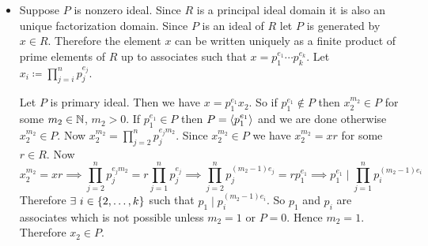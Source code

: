 \documentclass[a4paper, 11pt]{article}
\newtheorem{lemma}{Lemma}
\renewenvironment{proof}{\noindent{\it \textbf{Proof:}}\hspace*{1em}}{\hfill\qed\bigskip\\}
\begin{document}
{\begin{itemize}[label=$\bullet$]
Therefore $\la x\ra$ is the product  of finitely many prime ideals. Now we will show that prime ideals are maximal ideals in a principal ideal domain.
\begin{lemma}
	Every nonzero prime ideal in a principal ideal domain is maximal ideal.
\end{lemma}
\begin{proof}
	Let $\la p\ra$ be a nonzero prime ideal in the principal ideal domain. Let $I=\la y\ra$ where $y\in R$ be any idea which contains $\la p\ra$. We will show that $I=\la p\ra$ or $I=R$. Since $\la p\ra \subseteq I$ we have $p\in I$. Therefore there exists $r\in R$ such that $p=ry$. Since $\la p\ra$ is a prime ideal and $ry\in \la p\ra$ either $r\in \la p \ra$ or $y\in \la p \ra$. If $y\in \la p\ra$  then $\la y\ra=\la p\ra$.. But if $r\in \la p\ra$ then $\exs\ s\in R$ such that $r=ps$. Then $p=ry=psy\implies sx=1$. Therefore $y$ is an unit. Therefore $I=R$. Hence $\la p\ra$ is a maximal ideal
\end{proof}
Since $\la x\ra = \la p_1\ra^{e_1}\cdots \la p_k\ra^{e_k}$, $\forall\ i\in[k]$, $\la p_i\ra$ is a maximal ideal. Therefore $\la x\ra$ can be written as a finitely many product of maximal ideals which are uniquely determined up to order. 
	\item Suppose $P$ is nonzero ideal. Since $R$ is a principal ideal domain it is also an unique factorization domain. Since $P$ is an ideal of $R$ let $P$ is generated by $x\in R$. Therefore the element $x$ can be written uniquely as a finite product of prime elements of $R$ up to associates such that   $ x =  p_1^{e_1}\cdots  p_k ^{e_k} $. Let $x_i\coloneqq \prod\limits_{j=i}^{n} p_j^{e_j}$.\parinn 
	
	Let $P$ is primary ideal. Then we have $x=p_1 ^{e_1}x_2$. So if $p_1 ^{e_1}\notin P$ then $x_2^{m_2}\in P$ for some $m_2\in\mathbb{N}$, $m_2>0$. If $p_1 ^{e_1}\in P$ then $P=\langle p_1 ^{e_1}\rangle$ and we are done otherwise $x_2^{m_2}\in P$. Now $x_2^{m_2}=\prod\limits_{j=2}^{n} p_j^{e_jm_2}$. Since $x_2^{m_2}\in P$ we have $x_2^{m_2}=xr$ for some $r\in R$. Now $$x_2^{m_2}=xr\implies \prod\limits_{j=2}^{n} p_j^{e_jm_2}=r\prod\limits_{j=1}^{n} p_j^{e_j}\implies  \prod\limits_{j=2}^{n} p_j^{(m_2-1)e_j}=rp_1^{e_1} \implies p_1^{e_1}\mid \prod\limits_{j=1}^{n} p_i^{(m_2-1)e_i} $$Therefore  $\exists\ i\in\{2,\dots, k\}$ such that $p_1\mid p_i^{(m_2-1)e_i}$. So $p_1$ and $p_i$ are associates which is not possible unless $m_2=1$ or $P=0$. Hence $m_2=1$. Therefore $x_2\in P$. 
	

\end{itemize}}
\end{document}
